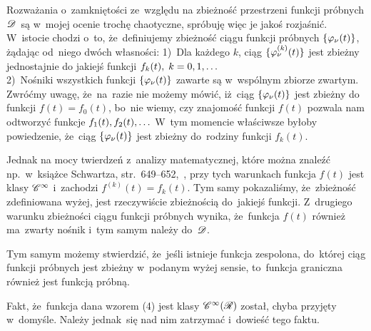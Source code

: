 \documentclass[a4paper,11pt]{article}
\begin{document}
\vspace{\spaceTwo}



\newpage
{}



\noi {}

\vspace{\spaceFour}


\start {} Rozważania o~zamkniętości ze~względu na zbieżność
przestrzeni funkcji próbnych $\mathcal{D}$~są w~mojej ocenie trochę
chaotyczne, spróbuję więc je jakoś rozjaśnić. W~istocie chodzi o~to,
że~definiujemy zbieżność ciągu funkcji próbnych
$\{  \varphi_{ \nu }( t )  \}$, żądając od~niego dwóch własności: 1)~Dla
każdego $k$, ciąg $\{  \varphi_{ \nu }^{ ( k ) }( t )  \}$ jest zbieżny
jednostajnie do jakiejś funkcji
$f_{ k }( t ), \; k = 0, 1, \ldots$ \\
2)~Nośniki wszystkich funkcji $\{  \varphi_{ \nu }( t )  \}$ zawarte są
w~wspólnym zbiorze zwartym. \\
Zwróćmy uwagę, że~na~razie nie możemy mówić, iż~ciąg
$\{  \varphi_{ \nu }( t )  \}$ jest zbieżny do funkcji
$f( t ) = f_{ 0 }( t )$, bo~nie wiemy, czy znajomość funkcji $f( t )$
pozwala nam odtworzyć funkcje $f_{ 1 }( t ), f_{ 2 }( t ), \ldots$ W~tym
momencie właściwsze byłoby powiedzenie, że~ciąg
$\{  \varphi_{ \nu }( t )  \}$ jest zbieżny do~rodziny funkcji
$f_{ k }( t )$.

Jednak na mocy twierdzeń z~analizy matematycznej, które można znaleźć
np.~w~książce Schwartza, str.~649--652,~\cite{Schwartz79}, przy tych
warunkach funkcja $f( t )$ jest klasy $\mathcal{C}^{ \infty }$ i~zachodzi
$f^{ ( k ) }( t ) = f_{ k }( t )$. Tym samy pokazaliśmy, że~zbieżność
zdefiniowana wyżej, jest rzeczywiście zbieżnością do~jakiejś funkcji.
Z~drugiego warunku zbieżności ciągu funkcji próbnych wynika,
że~funkcja $f( t )$ również ma~zwarty nośnik i~tym samym należy
do~$\mathcal{D}$.

Tym samym możemy stwierdzić, że~jeśli istnieje funkcja zespolona,
do~której ciąg funkcji próbnych jest zbieżny w~podanym wyżej sensie,
to~funkcja graniczna również jest funkcją próbną.

\vspace{\spaceFour}


\start {} Fakt, że~funkcja dana wzorem (4) jest klasy
$\mathcal{C}^{ \infty }( \mathcal{R} )$ został, chyba przyjęty w~domyśle. Należy jednak~się nad
nim zatrzymać i~dowieść tego faktu. \Dok
\end{document}
